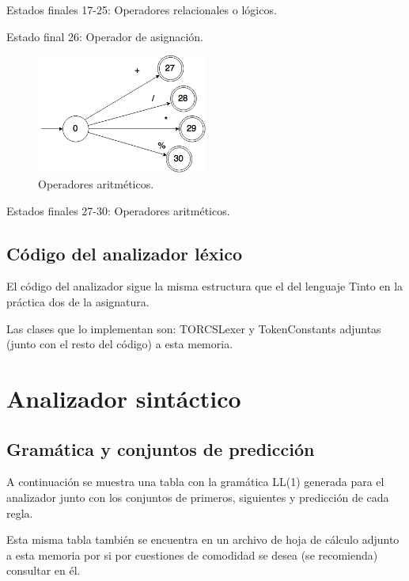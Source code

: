 \documentclass[11pt]{article}
\begin{document}
Estados finales 17-25: Operadores relacionales o lógicos.

Estado final 26: Operador de asignación.


\begin{figure}[H]
\centering
\includegraphics[width=0.5\textwidth]{./DiagramasAutomata/img/OperadoresAritmBueno.png}
\caption{Operadores aritméticos.} \label{fig:aritm}
\end{figure}

Estados finales 27-30: Operadores aritméticos.

\subsection{Código del analizador léxico}

El código del analizador sigue la misma estructura que el del lenguaje Tinto en la práctica dos de la asignatura.

Las clases que lo implementan son: TORCSLexer y TokenConstants adjuntas (junto con el resto del código) a esta memoria.


\section{Analizador sintáctico}

\subsection{Gramática y conjuntos de predicción}

A continuación se muestra una tabla con la gramática LL(1) generada para el analizador junto con los conjuntos de primeros,
 siguientes y predicción de cada regla.

 Esta misma tabla también se encuentra en un archivo de hoja de cálculo adjunto a esta memoria por si por cuestiones de
 comodidad se desea (se recomienda) consultar en él.



\newpage
\end{document}
